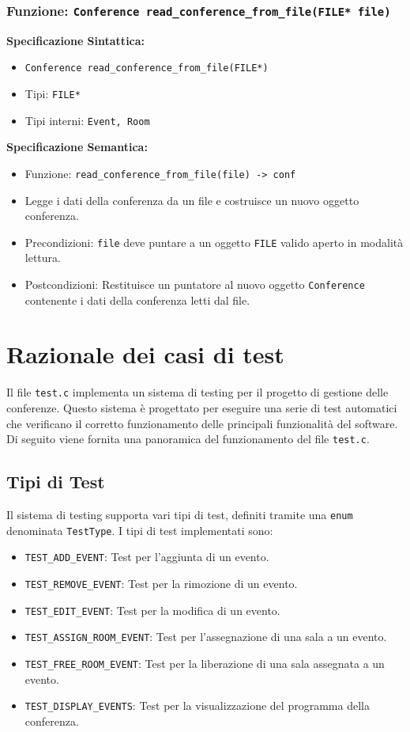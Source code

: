 \documentclass[11pt]{scrartcl} %
\begin{document}
\subsubsection{Funzione: \texttt{Conference read\_conference\_from\_file(FILE* file)}}

\textbf{Specificazione Sintattica:}
\begin{itemize}
\item \texttt{Conference read\_conference\_from\_file(FILE*)}
\item Tipi: \texttt{FILE*}
\item Tipi interni: \texttt{Event, Room}
\end{itemize}

\textbf{Specificazione Semantica:}
\begin{itemize}
\item Funzione: \texttt{read\_conference\_from\_file(file) -> conf}
\item Legge i dati della conferenza da un file e costruisce un nuovo oggetto conferenza.
\item Precondizioni: \texttt{file} deve puntare a un oggetto \texttt{FILE} valido aperto in modalità lettura.
\item Postcondizioni: Restituisce un puntatore al nuovo oggetto \texttt{Conference} contenente i dati della conferenza letti dal file.
\end{itemize}

\section{Razionale dei casi di test}
Il file \texttt{test.c} implementa un sistema di testing per il progetto di gestione delle conferenze. Questo sistema è progettato per eseguire una serie di test automatici che verificano il corretto funzionamento delle principali funzionalità del software. Di seguito viene fornita una panoramica del funzionamento del file \texttt{test.c}.

\subsection{Tipi di Test}
Il sistema di testing supporta vari tipi di test, definiti tramite una \texttt{enum} denominata \texttt{TestType}. I tipi di test implementati sono:
\begin{itemize}
    \item \texttt{TEST\_ADD\_EVENT}: Test per l'aggiunta di un evento.
    \item \texttt{TEST\_REMOVE\_EVENT}: Test per la rimozione di un evento.
    \item \texttt{TEST\_EDIT\_EVENT}: Test per la modifica di un evento.
    \item \texttt{TEST\_ASSIGN\_ROOM\_EVENT}: Test per l'assegnazione di una sala a un evento.
    \item \texttt{TEST\_FREE\_ROOM\_EVENT}: Test per la liberazione di una sala assegnata a un evento.
    \item \texttt{TEST\_DISPLAY\_EVENTS}: Test per la visualizzazione del programma della conferenza.
\end{itemize}
\end{document}
